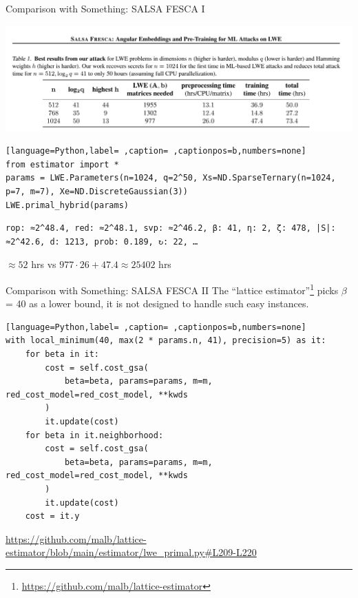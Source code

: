 \documentclass[xcolor=table,10pt,aspectratio=169]{beamer}
\begin{document}
\begin{frame}[label={sec:orge790b4f},fragile]{Comparison with Something: SALSA FESCA I}
 \begin{center}
\includegraphics[width=.9\linewidth]{./salsa-fresca-results.png}
\end{center}

\begin{lstlisting}[language=Python,label= ,caption= ,captionpos=b,numbers=none]
from estimator import *
params = LWE.Parameters(n=1024, q=2^50, Xs=ND.SparseTernary(n=1024, p=7, m=7), Xe=ND.DiscreteGaussian(3))
LWE.primal_hybrid(params)
\end{lstlisting}

\begin{verbatim}
rop: ≈2^48.4, red: ≈2^48.1, svp: ≈2^46.2, β: 41, η: 2, ζ: 478, |S|: ≈2^42.6, d: 1213, prob: 0.189, ↻: 22, …
\end{verbatim}


\begin{center}
\(\approx 52\) hrs vs \(977 \cdot 26 + 47.4 \approx 25402\) hrs 
\end{center}
\end{frame}

\begin{frame}[label={sec:org1d7a166},fragile]{Comparison with \alert{Something}: SALSA FESCA II}
 The ``lattice estimator''\footnote{\url{https://github.com/malb/lattice-estimator}} picks \(\beta\) = 40 as a lower bound, it is not designed to handle such easy instances.

\begin{lstlisting}[language=Python,label= ,caption= ,captionpos=b,numbers=none]
with local_minimum(40, max(2 * params.n, 41), precision=5) as it:
    for beta in it:
        cost = self.cost_gsa(
            beta=beta, params=params, m=m, red_cost_model=red_cost_model, **kwds
        )
        it.update(cost)
    for beta in it.neighborhood:
        cost = self.cost_gsa(
            beta=beta, params=params, m=m, red_cost_model=red_cost_model, **kwds
        )
        it.update(cost)
    cost = it.y
\end{lstlisting}

{\footnotesize \url{https://github.com/malb/lattice-estimator/blob/main/estimator/lwe\_primal.py\#L209-L220} \par}
\end{frame}
\end{document}
